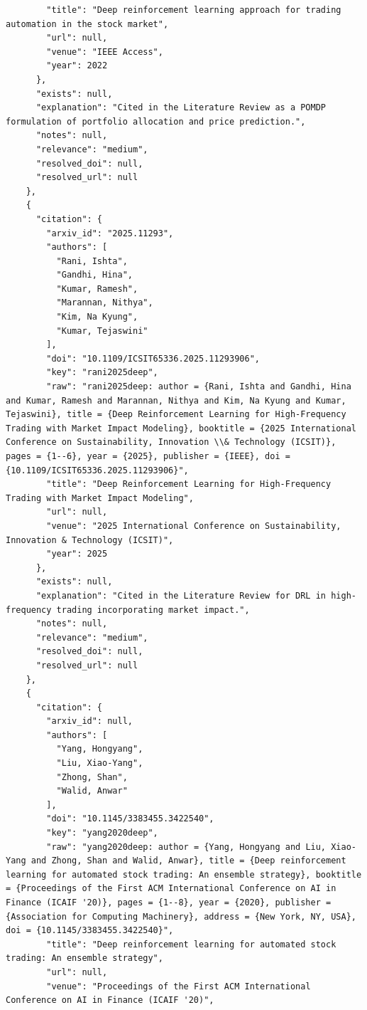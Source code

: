 \documentclass[11pt]{article}
\begin{document}
\begin{verbatim}
        "title": "Deep reinforcement learning approach for trading automation in the stock market",
        "url": null,
        "venue": "IEEE Access",
        "year": 2022
      },
      "exists": null,
      "explanation": "Cited in the Literature Review as a POMDP formulation of portfolio allocation and price prediction.",
      "notes": null,
      "relevance": "medium",
      "resolved_doi": null,
      "resolved_url": null
    },
    {
      "citation": {
        "arxiv_id": "2025.11293",
        "authors": [
          "Rani, Ishta",
          "Gandhi, Hina",
          "Kumar, Ramesh",
          "Marannan, Nithya",
          "Kim, Na Kyung",
          "Kumar, Tejaswini"
        ],
        "doi": "10.1109/ICSIT65336.2025.11293906",
        "key": "rani2025deep",
        "raw": "rani2025deep: author = {Rani, Ishta and Gandhi, Hina and Kumar, Ramesh and Marannan, Nithya and Kim, Na Kyung and Kumar, Tejaswini}, title = {Deep Reinforcement Learning for High-Frequency Trading with Market Impact Modeling}, booktitle = {2025 International Conference on Sustainability, Innovation \\& Technology (ICSIT)}, pages = {1--6}, year = {2025}, publisher = {IEEE}, doi = {10.1109/ICSIT65336.2025.11293906}",
        "title": "Deep Reinforcement Learning for High-Frequency Trading with Market Impact Modeling",
        "url": null,
        "venue": "2025 International Conference on Sustainability, Innovation & Technology (ICSIT)",
        "year": 2025
      },
      "exists": null,
      "explanation": "Cited in the Literature Review for DRL in high-frequency trading incorporating market impact.",
      "notes": null,
      "relevance": "medium",
      "resolved_doi": null,
      "resolved_url": null
    },
    {
      "citation": {
        "arxiv_id": null,
        "authors": [
          "Yang, Hongyang",
          "Liu, Xiao-Yang",
          "Zhong, Shan",
          "Walid, Anwar"
        ],
        "doi": "10.1145/3383455.3422540",
        "key": "yang2020deep",
        "raw": "yang2020deep: author = {Yang, Hongyang and Liu, Xiao-Yang and Zhong, Shan and Walid, Anwar}, title = {Deep reinforcement learning for automated stock trading: An ensemble strategy}, booktitle = {Proceedings of the First ACM International Conference on AI in Finance (ICAIF '20)}, pages = {1--8}, year = {2020}, publisher = {Association for Computing Machinery}, address = {New York, NY, USA}, doi = {10.1145/3383455.3422540}",
        "title": "Deep reinforcement learning for automated stock trading: An ensemble strategy",
        "url": null,
        "venue": "Proceedings of the First ACM International Conference on AI in Finance (ICAIF '20)",

\end{verbatim}
\end{document}
